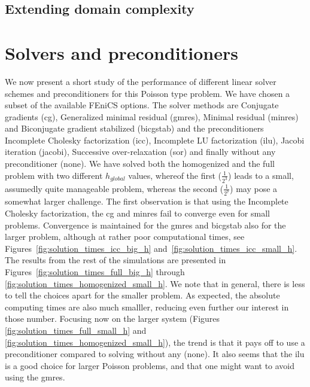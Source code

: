 \documentclass{article}
\begin{document}
  \subsection{Extending domain complexity}
  \section{Solvers and preconditioners}
  We now present a short study of the performance of different linear solver schemes and preconditioners for this Poisson type problem. We have chosen a subset of the available FEniCS options. The solver methods are Conjugate gradients (cg), Generalized minimal residual (gmres), Minimal residual (minres) and Biconjugate gradient stabilized (bicgstab) and the preconditioners Incomplete Cholesky factorization (icc), Incomplete LU factorization (ilu),  Jacobi iteration (jacobi), Successive over-relaxation (sor) and finally without any preconditioner (none). We have solved both the homogenized and the full problem with two different $h_{global}$ values, whereof the first ($\frac{1}{2^3}$) leads to a small, assumedly quite manageable problem, whereas the second ($\frac{1}{2^7}$) may pose a somewhat larger challenge.
  The first observation is that using the Incomplete Cholesky factorization, the cg and minres fail to converge even for small problems. Convergence is maintained for the gmres and bicgstab also for the larger problem, although at rather poor computational times, see Figures~\ref{fig:solution_times_icc_big_h} and~\ref{fig:solution_times_icc_small_h}. The results from the rest of the simulations are presented in Figures~\ref{fig:solution_times_full_big_h} through \ref{fig:solution_times_homogenized_small_h}. We note that in general, there is less to tell the choices apart for the smaller problem. As expected, the absolute computing times are also much smalller, reducing even further our interest in those number. Focusing now on the larger system (Figures \ref{fig:solution_times_full_small_h} and \ref{fig:solution_times_homogenized_small_h}), the trend is that it pays off to use a preconditioner compared to solving without any (none). It also seems that the ilu is a good choice for larger Poisson problems, and that one might want to avoid using the gmres.
\end{document}
